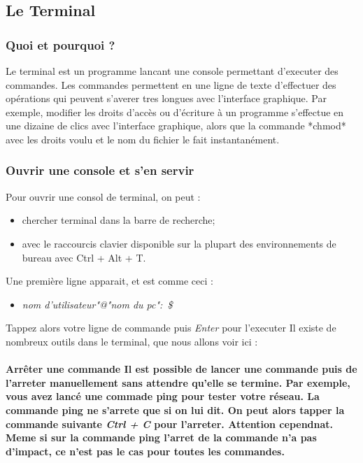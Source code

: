 \subsection{Le Terminal}
\subsubsection{Quoi et pourquoi ?}
Le terminal est un programme lancant une console permettant d'executer des commandes. Les commandes permettent en une ligne de texte d'effectuer des opérations qui peuvent s'averer tres longues avec l'interface graphique. Par exemple, modifier les droits d'accès ou d'écriture à un programme s'effectue en une dizaine de clics avec l'interface graphique, alors que la commande *chmod* avec les droits voulu et le nom du fichier le fait instantanément. 
\subsubsection{Ouvrir une console et s'en servir}
Pour ouvrir une consol de terminal, on peut :
\begin{itemize}
\item chercher terminal dans la barre de recherche;
\item avec le raccourcis clavier disponible sur la plupart des environnements de bureau avec Ctrl + Alt + T.
\end{itemize}
Une première ligne apparait, et est comme ceci :
\begin{itemize}
\item \textit{nom d'utilisateur"@"nom du pc":~\$}
\end{itemize}
Tappez alors votre ligne de commande puis \textit{Enter} pour l'executer
Il existe de nombreux outils dans le terminal, que nous allons voir ici :
\paragraph{
\textbf{Arrêter une commande}
Il est possible de lancer une commande puis de l'arreter manuellement sans attendre qu'elle se termine. Par exemple, vous avez lancé une commade ping pour tester votre réseau. La commande ping ne s'arrete que si on lui dit. On peut alors tapper la commande suivante \textit{Ctrl + C} pour l'arreter. Attention cependnat. Meme si sur la commande ping l'arret de la commande n'a pas d'impact, ce n'est pas le cas pour toutes les commandes.}
